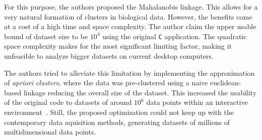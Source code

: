 For this purpose, the authors proposed the Mahalanobis linkage. This allows for a very natural formation of clusters in biological data. However, the benefits come at a cost of a high time and space complexity. The author claim the upper usable bound of dataset size to be $10^4$ using the original \texttt{C} application. The quadratic space complexity makes for the most significant limiting factor, making it unfeasible to analyze bigger datasets on current desktop computers.

The authors tried to alleviate this limitation by implementing the approximation of \emph{apriori clusters}, where the data was pre-clustered using a naive euclidean-based linkage reducing the overall size of the dataset. This increased the usability of the original code to datasets of around $10^6$ data points within an interactive environment~\cite{kratochvil2020shinysom}. Still, the proposed optimization could not keep up with the contemporary data aquisition methods, generating datasets of millions of multidimensional data points.









